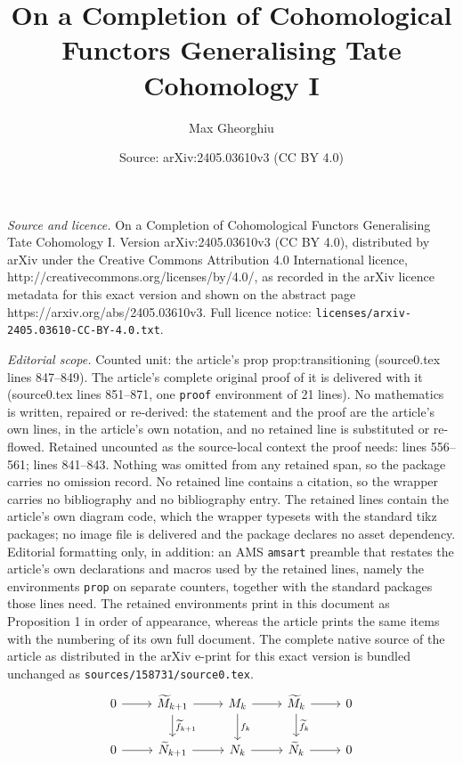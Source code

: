 \documentclass[10pt,a4paper]{amsart}
\title{On a Completion of Cohomological Functors Generalising Tate Cohomology I}
\author{Max Gheorghiu}
\date{Source: arXiv:2405.03610v3 (CC BY 4.0)}
\begin{document}
\maketitle

\noindent\emph{Source and licence.} On a Completion of Cohomological Functors Generalising Tate Cohomology I. Version arXiv:2405.03610v3 (CC BY 4.0), distributed by arXiv under the Creative Commons Attribution 4.0 International licence, http://creativecommons.org/licenses/by/4.0/, as recorded in the arXiv licence metadata for this exact version and shown on the abstract page https://arxiv.org/abs/2405.03610v3. Full licence notice: \texttt{licenses/arxiv-2405.03610-CC-BY-4.0.txt}.\par\smallskip

\noindent\textit{Editorial scope.} Counted unit: the article's prop prop:transitioning (source0.tex lines 847--849). The article's complete original proof of it is delivered with it (source0.tex lines 851--871, one \texttt{proof} environment of 21 lines). No mathematics is written, repaired or re-derived: the statement and the proof are the article's own lines, in the article's own notation, and no retained line is substituted or re-flowed.  Retained uncounted as the source-local context the proof needs: lines 556--561; lines 841--843.  Nothing was omitted from any retained span, so the package carries no omission record.  No retained line contains a citation, so the wrapper carries no bibliography and no bibliography entry.  The retained lines contain the article's own diagram code, which the wrapper typesets with the standard tikz packages; no image file is delivered and the package declares no asset dependency.  Editorial formatting only, in addition: an AMS \texttt{amsart} preamble that restates the article's own declarations and macros used by the retained lines, namely the environments \texttt{prop} on separate counters, together with the standard packages those lines need.  The retained environments print in this document as Proposition 1 in order of appearance, whereas the article prints the same items with the numbering of its own full document.  The complete native source of the article as distributed in the arXiv e-print for this exact version is bundled unchanged as \texttt{sources/158731/source0.tex}.
\begin{equation}\label{diag:complexlift}
\begin{tikzcd}
    0 \arrow[r] & \widetilde{M}_{k+1} \arrow[r] \arrow[d, "\widetilde{f}_{k+1}"] & M_k \arrow[r] \arrow[d, "f_k"] & \widetilde{M}_k \arrow[r] \arrow[d, "\widetilde{f}_k"] & 0 \\
    0 \arrow[r] & \widetilde{N}_{k+1} \arrow[r] & N_k \arrow[r] & \widetilde{N}_k \arrow[r] & 0
\end{tikzcd}
\end{equation}
\end{document}

